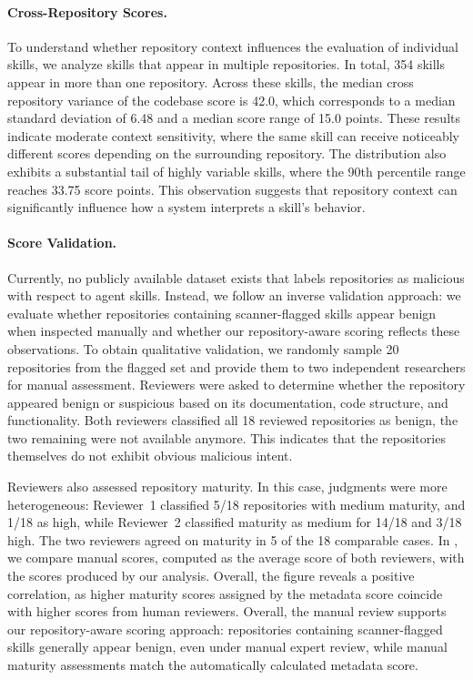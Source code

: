\paragraph{Cross-Repository Scores.}
To understand whether repository context influences the evaluation of individual skills, we analyze skills that appear in multiple repositories. In total, 354 skills appear in more than one repository. Across these skills, the median cross repository variance of the codebase score is 42.0, which corresponds to a median standard deviation of 6.48 and a median score range of 15.0 points. These results indicate moderate context sensitivity, where the same skill can receive noticeably different scores depending on the surrounding repository. The distribution also exhibits a substantial tail of highly variable skills, where the 90th percentile range reaches 33.75 score points. This observation suggests that repository context can significantly influence how a system interprets a skill's behavior.

\paragraph{Score Validation.}
Currently, no publicly available dataset exists that labels repositories as malicious with respect to agent skills. Instead, we follow an inverse validation approach: we evaluate whether repositories containing scanner-flagged skills appear benign when inspected manually and whether our repository-aware scoring reflects these observations.
To obtain qualitative validation, we randomly sample 20 repositories from the flagged set and provide them to two independent researchers for manual assessment. Reviewers were asked to determine whether the repository appeared benign or suspicious based on its documentation, code structure, and functionality. Both reviewers classified all 18 reviewed repositories as benign, the two remaining were not available anymore. This indicates that the repositories themselves do not exhibit obvious malicious intent.

Reviewers also assessed repository maturity. In this case, judgments were more heterogeneous: Reviewer~1 classified 5/18 repositories with medium maturity, and 1/18 as high, while Reviewer~2 classified maturity as medium for 14/18 and 3/18 high. The two reviewers agreed on maturity in 5 of the 18 comparable cases. 
In , we compare manual scores, computed as the average score of both reviewers, with the scores produced by our analysis. Overall, the figure reveals a positive correlation, as higher maturity scores assigned by the metadata score coincide with higher scores from human reviewers.
Overall, the manual review supports our repository-aware scoring approach: repositories containing scanner-flagged skills generally appear benign, even under manual expert review, while manual maturity assessments match the automatically calculated metadata score. 

